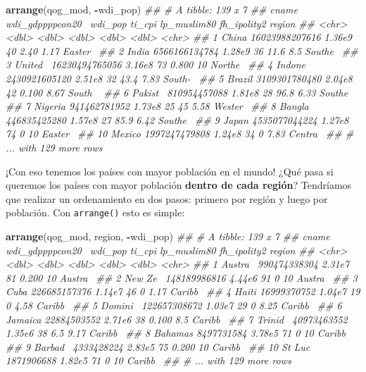 \documentclass[]{book}
\newenvironment{Shaded}{\begin{snugshade}}{\end{snugshade}}
\newcommand{\CommentTok}[1]{\textcolor[rgb]{0.56,0.35,0.01}{\textit{#1}}}
\newcommand{\KeywordTok}[1]{\textcolor[rgb]{0.13,0.29,0.53}{\textbf{#1}}}
\newcommand{\NormalTok}[1]{#1}
\newcommand{\OperatorTok}[1]{\textcolor[rgb]{0.81,0.36,0.00}{\textbf{#1}}}
\begin{document}
\begin{Shaded}
\begin{Highlighting}[]
\KeywordTok{arrange}\NormalTok{(qog_mod, }\OperatorTok{-}\NormalTok{wdi_pop)}
\CommentTok{## # A tibble: 139 x 7}
\CommentTok{##    cname   wdi_gdppppcon20~ wdi_pop ti_cpi lp_muslim80 fh_ipolity2 region }
\CommentTok{##    <chr>              <dbl>   <dbl>  <dbl>       <dbl>       <dbl> <chr>  }
\CommentTok{##  1 China     16023988207616  1.36e9     40       2.40         1.17 Easter~}
\CommentTok{##  2 India      6566166134784  1.28e9     36      11.6          8.5  Southe~}
\CommentTok{##  3 United~   16230494765056  3.16e8     73       0.800       10    Northe~}
\CommentTok{##  4 Indone~    2430921605120  2.51e8     32      43.4          7.83 South-~}
\CommentTok{##  5 Brazil     3109301780480  2.04e8     42       0.100        8.67 South ~}
\CommentTok{##  6 Pakist~     810954457088  1.81e8     28      96.8          6.33 Southe~}
\CommentTok{##  7 Nigeria     941462781952  1.73e8     25      45            5.58 Wester~}
\CommentTok{##  8 Bangla~     446835425280  1.57e8     27      85.9          6.42 Southe~}
\CommentTok{##  9 Japan      4535077044224  1.27e8     74       0           10    Easter~}
\CommentTok{## 10 Mexico     1997247479808  1.24e8     34       0            7.83 Centra~}
\CommentTok{## # ... with 129 more rows}
\end{Highlighting}
\end{Shaded}

¡Con eso tenemos los países con mayor población en el mundo! ¿Qué pasa
si queremos los países con mayor población \textbf{dentro de cada
región}? Tendríamos que realizar un ordenamiento en dos pasos: primero
por región y luego por población. Con \texttt{arrange()} esto es simple:

\begin{Shaded}
\begin{Highlighting}[]
\KeywordTok{arrange}\NormalTok{(qog_mod, region, }\OperatorTok{-}\NormalTok{wdi_pop)}
\CommentTok{## # A tibble: 139 x 7}
\CommentTok{##    cname   wdi_gdppppcon20~ wdi_pop ti_cpi lp_muslim80 fh_ipolity2 region }
\CommentTok{##    <chr>              <dbl>   <dbl>  <dbl>       <dbl>       <dbl> <chr>  }
\CommentTok{##  1 Austra~     990474338304  2.31e7     81       0.200       10    Austra~}
\CommentTok{##  2 New Ze~     148189986816  4.44e6     91       0           10    Austra~}
\CommentTok{##  3 Cuba        226685157376  1.14e7     46       0            1.17 Caribb~}
\CommentTok{##  4 Haiti        16999370752  1.04e7     19       0            4.58 Caribb~}
\CommentTok{##  5 Domini~     122657308672  1.03e7     29       0            8.25 Caribb~}
\CommentTok{##  6 Jamaica      22884503552  2.71e6     38       0.100        8.5  Caribb~}
\CommentTok{##  7 Trinid~      40973463552  1.35e6     38       6.5          9.17 Caribb~}
\CommentTok{##  8 Bahamas       8497731584  3.78e5     71       0           10    Caribb~}
\CommentTok{##  9 Barbad~       4333428224  2.83e5     75       0.200       10    Caribb~}
\CommentTok{## 10 St Luc~       1871906688  1.82e5     71       0           10    Caribb~}
\CommentTok{## # ... with 129 more rows}
\end{Highlighting}
\end{Shaded}
\end{document}
